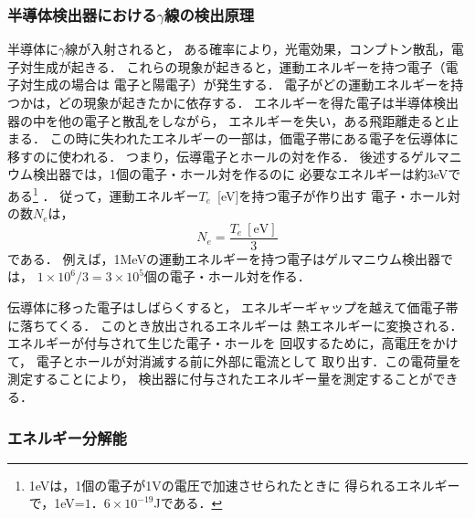 \documentclass[a4j,10pt,oneside,openany]{jsbook}
\begin{document}
{\subsubsection{半導体検出器における$\gamma$線の検出原理}

半導体に$\gamma$線が入射されると，
ある確率により，光電効果，コンプトン散乱，電子対生成が起きる．
これらの現象が起きると，運動エネルギーを持つ電子（電子対生成の場合は
電子と陽電子）が発生する．
電子がどの運動エネルギーを持つかは，どの現象が起きたかに依存する．
エネルギーを得た電子は半導体検出器の中を他の電子と散乱をしながら，
エネルギーを失い，ある飛距離走ると止まる．
この時に失われたエネルギーの一部は，価電子帯にある電子を伝導体に
移すのに使われる．
つまり，伝導電子とホールの対を作る．
後述するゲルマニウム検出器では，1個の電子・ホール対を作るのに
必要なエネルギーは約$3$eVである\footnote{
1eVは，1個の電子が1Vの電圧で加速させられたときに
得られるエネルギーで，1eV=$1．6\times 10^{-19}$Jである．} ．
従って，運動エネルギー$T_e$~[eV]を持つ電子が作り出す
電子・ホール対の数$N_e$は，
\begin{equation}
  N_e = \frac{T_e~[\mbox{eV}]}{3}
\end{equation}
である．
例えば，1MeVの運動エネルギーを持つ電子はゲルマニウム検出器では，
$1\times 10^6/3 = 3\times 10^5$個の電子・ホール対を作る．

伝導体に移った電子はしばらくすると，
エネルギーギャップを越えて価電子帯に落ちてくる．
このとき放出されるエネルギーは
熱エネルギーに変換される．
エネルギーが付与されて生じた電子・ホールを
回収するために，高電圧をかけて，
電子とホールが対消滅する前に外部に電流として
取り出す．この電荷量を測定することにより，
検出器に付与されたエネルギー量を測定することができる．

\subsubsection{エネルギー分解能}

}
\end{document}

